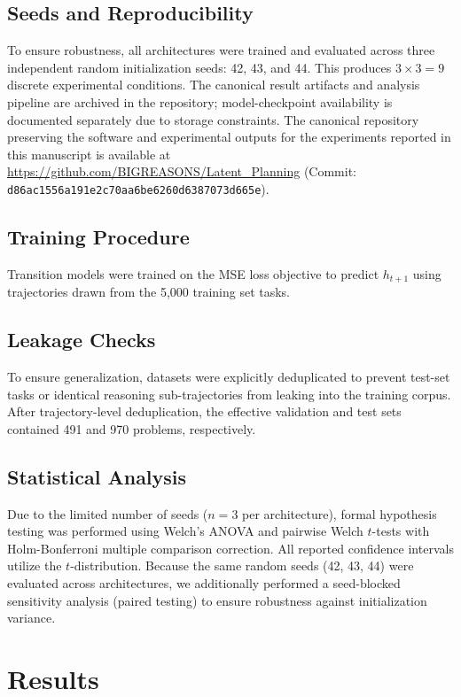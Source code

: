 \documentclass[conference]{IEEEtran}
\begin{document}
\subsection{Seeds and Reproducibility}
To ensure robustness, all architectures were trained and evaluated across three independent random initialization seeds: 42, 43, and 44. This produces $3 \times 3 = 9$ discrete experimental conditions. The canonical result artifacts and analysis pipeline are archived in the repository; model-checkpoint availability is documented separately due to storage constraints. The canonical repository preserving the software and experimental outputs for the experiments reported in this manuscript is available at \url{https://github.com/BIGREASONS/Latent_Planning} (Commit: \texttt{d86ac1556a191e2c70aa6be6260d6387073d665e}).

\subsection{Training Procedure}
Transition models were trained on the MSE loss objective to predict $h_{t+1}$ using trajectories drawn from the 5,000 training set tasks.

\subsection{Leakage Checks}
To ensure generalization, datasets were explicitly deduplicated to prevent test-set tasks or identical reasoning sub-trajectories from leaking into the training corpus. After trajectory-level deduplication, the effective validation and test sets contained 491 and 970 problems, respectively.

\subsection{Statistical Analysis}
Due to the limited number of seeds ($n=3$ per architecture), formal hypothesis testing was performed using Welch's ANOVA and pairwise Welch $t$-tests with Holm-Bonferroni multiple comparison correction. All reported confidence intervals utilize the $t$-distribution. Because the same random seeds (42, 43, 44) were evaluated across architectures, we additionally performed a seed-blocked sensitivity analysis (paired testing) to ensure robustness against initialization variance.

\section{Results}
\end{document}
